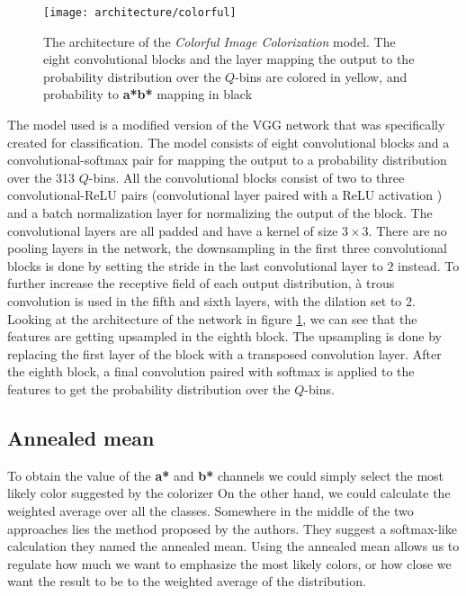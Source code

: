 \begin{figure}[!ht]
	\centering
	\texttt{[image: architecture/colorful]}
    \caption{The architecture of the \textit{Colorful Image Colorization} model. 
	The eight convolutional blocks and the layer mapping the output to the probability 
	distribution over the $Q$-bins are colored in yellow, and probability to \textbf{a*b*}
	mapping in black}
	\label{fig:architecture_colorful}
\end{figure}

The model used is a modified version of the VGG \citep{simonyan2015vgg} network 
that was specifically created for classification. The model consists of eight
convolutional blocks and a convolutional-softmax pair for mapping the output to a
probability distribution over the 313 $Q$-bins.	All the convolutional blocks
consist of two to three convolutional-ReLU pairs (convolutional layer
paired with a ReLU activation \citep{abien2018relu}) and a batch normalization layer 
\citep{ioffe2015batchnorm} for normalizing the output of the block. 
The convolutional layers are all padded and have a kernel of size $3\times3$. There are 
no pooling layers in the network, the downsampling in the first three convolutional blocks 
is done by setting the stride in the last convolutional layer to $2$ instead.
To further increase the receptive field of each output distribution, à trous convolution
\citep{yu2016atrous} is used in the fifth and sixth layers, with the dilation set to $2$. 
Looking at the architecture of the network in figure \ref{fig:architecture_colorful},
we can see that the features are getting upsampled in the eighth block. The upsampling
is done by replacing the first layer of the block with a transposed convolution layer.
After the eighth block, a final convolution paired with softmax is applied to the 
features to get the probability distribution over the $Q$-bins. 

\subsection{Annealed mean}

To obtain the value of the \textbf{a*} and \textbf{b*} channels we could 
simply select the most likely color suggested by the colorizer On 
the other hand, we could calculate the weighted average over all the classes.
Somewhere in the middle of the two approaches lies the method proposed by 
the authors. They suggest a softmax-like calculation they named the annealed mean.
Using the annealed mean allows us to regulate how much we want to emphasize the 
most likely colors, or how close we want the result to be to the weighted 
average of the distribution.

